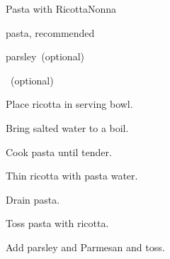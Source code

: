 \begin{recipe}{Pasta with Ricotta}{Nonna}{}

\begin{ingredients}
\item {}
\item pasta,  recommended
\item parsley~(optional)
\item {}~(optional)
\end{ingredients}

\begin{directions}
\item Place ricotta in serving bowl.
\item Bring salted water to a boil.
\item Cook pasta until tender.
\item Thin ricotta with pasta water.
\item Drain pasta.
\item Toss pasta with ricotta.
\item Add parsley and Parmesan and toss.
\end{directions}

\end{recipe}
